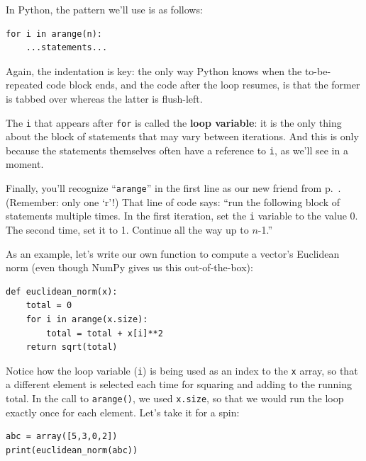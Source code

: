 \smallskip

In Python, the pattern we'll use is as follows:

\begin{Verbatim}[fontsize=\small,samepage=true,frame=single,framesep=3mm]
for i in arange(n):
    ...statements...
\end{Verbatim}


Again, the indentation is key: the only way Python knows when the
to-be-repeated code block ends, and the code after the loop resumes, is that
the former is tabbed over whereas the latter is flush-left.

The \texttt{i} that appears after \texttt{for} is called the \textbf{loop
variable}: it is the only thing about the block of statements that may vary
between iterations. And this is only because the statements themselves often
have a reference to \texttt{i}, as we'll see in a moment.

Finally, you'll recognize ``\texttt{arange}'' in the first line as our new
friend from p.~\pageref{arange}. (Remember: only one `r'!) That line of code
says: ``run the following block of statements multiple times. In the first
iteration, set the \texttt{i} variable to the value 0. The second time, set it
to 1. Continue all the way up to $n$-1.''

\medskip

As an example, let's write our own function to compute a vector's Euclidean
norm (even though NumPy gives us this out-of-the-box):

\begin{Verbatim}[fontsize=\small,samepage=true,frame=single,framesep=3mm]
def euclidean_norm(x):
    total = 0
    for i in arange(x.size):
        total = total + x[i]**2
    return sqrt(total)
\end{Verbatim}

Notice how the loop variable (\texttt{i}) is being used as an index to the
\texttt{x} array, so that a different element is selected each time for
squaring and adding to the running total. In the call to \texttt{arange()}, we
used \texttt{x.size}, so that we would run the loop exactly once for each
element. Let's take it for a spin:

\begin{Verbatim}[fontsize=\small,samepage=true,frame=single,framesep=3mm]
abc = array([5,3,0,2])
print(euclidean_norm(abc))
\end{Verbatim}
\vspace{-.2in}

